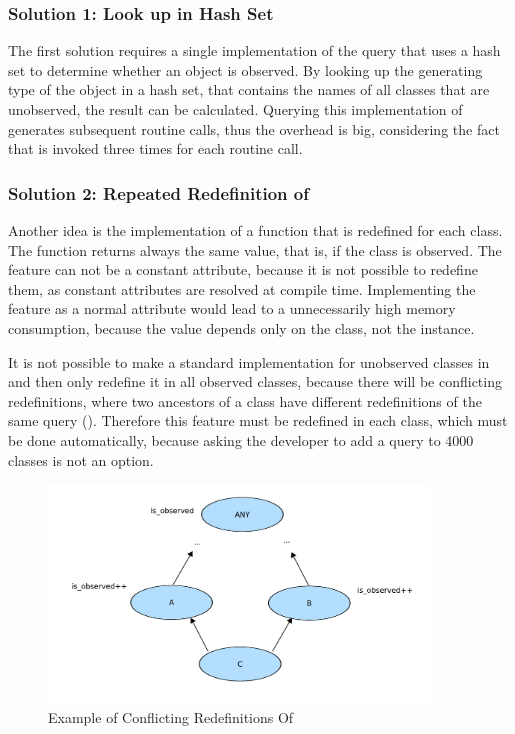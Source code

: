 \subsubsection{Solution 1: Look up in Hash Set}
The first solution requires a single implementation of the query  that uses a hash set to determine whether an object is observed. By looking up the generating type of the object in a hash set, that contains the names of all classes that are unobserved, the result can be calculated. Querying this implementation of  generates subsequent routine calls, thus the overhead is big, considering the fact that  is invoked three times for each routine call.

\subsubsection{Solution 2: Repeated Redefinition of }
Another idea is the implementation of a function that is redefined for each class. The function returns always the same value, that is, if the class is observed. The feature can not be a constant attribute, because it is not possible to redefine them, as constant attributes  are resolved at compile time. Implementing the feature as a normal attribute would lead to a unnecessarily high memory consumption, because the value depends only on the class, not the instance.

It is not possible to make a standard implementation for unobserved classes in  and then only redefine it in all observed classes, because there will be conflicting redefinitions, where two ancestors of a class have different redefinitions of the same query \cite{oosc2} (). Therefore this feature must be redefined in each class, which must be done automatically, because asking the developer to add a query to 4000 classes is not an option.
\begin{figure}[ht]
  \centering
  \includegraphics[width=0.9\textwidth]{illustrations/observed_query_conflicting_redefinitions}
  \caption{Example of Conflicting Redefinitions Of }
  \label{fig:observed_query_conflicting_redefinitions}
\end{figure}

